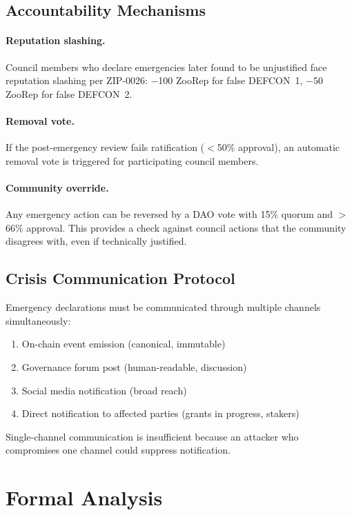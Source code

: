 \documentclass[11pt,letterpaper]{article}
\begin{document}
\subsection{Accountability Mechanisms}

\paragraph{Reputation slashing.} Council members who declare emergencies later found to be unjustified face reputation slashing per ZIP-0026: $-$100 ZooRep for false DEFCON~1, $-$50 ZooRep for false DEFCON~2.

\paragraph{Removal vote.} If the post-emergency review fails ratification ($<$50\% approval), an automatic removal vote is triggered for participating council members.

\paragraph{Community override.} Any emergency action can be reversed by a DAO vote with 15\% quorum and $>$66\% approval. This provides a check against council actions that the community disagrees with, even if technically justified.

\subsection{Crisis Communication Protocol}

Emergency declarations must be communicated through multiple channels simultaneously:
\begin{enumerate}
    \item On-chain event emission (canonical, immutable)
    \item Governance forum post (human-readable, discussion)
    \item Social media notification (broad reach)
    \item Direct notification to affected parties (grants in progress, stakers)
\end{enumerate}

Single-channel communication is insufficient because an attacker who compromises one channel could suppress notification.

\section{Formal Analysis}
\label{sec:analysis}
\end{document}
